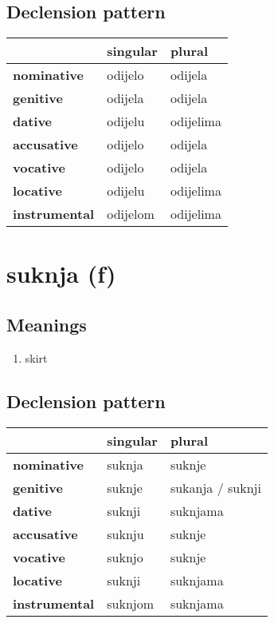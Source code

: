 \subsection*{Declension pattern}
\begin{tabularx}{\linewidth}{Xll}
\toprule
{} &  singular &     plural \\
\midrule
\textbf{nominative  } &   odijelo &    odijela \\
\textbf{genitive    } &   odijela &    odijela \\
\textbf{dative      } &   odijelu &  odijelima \\
\textbf{accusative  } &   odijelo &    odijela \\
\textbf{vocative    } &   odijelo &    odijela \\
\textbf{locative    } &   odijelu &  odijelima \\
\textbf{instrumental} &  odijelom &  odijelima \\
\bottomrule
\end{tabularx}

\filbreak
\section{suknja (f)}
\subsection*{Meanings}
\begin{enumerate}
\item skirt
\end{enumerate}
\subsection*{Declension pattern}
\begin{tabularx}{\linewidth}{Xll}
\toprule
{} & singular &            plural \\
\midrule
\textbf{nominative  } &   suknja &            suknje \\
\textbf{genitive    } &   suknje &  sukanja / suknji \\
\textbf{dative      } &   suknji &          suknjama \\
\textbf{accusative  } &   suknju &            suknje \\
\textbf{vocative    } &   suknjo &            suknje \\
\textbf{locative    } &   suknji &          suknjama \\
\textbf{instrumental} &  suknjom &          suknjama \\
\bottomrule
\end{tabularx}

